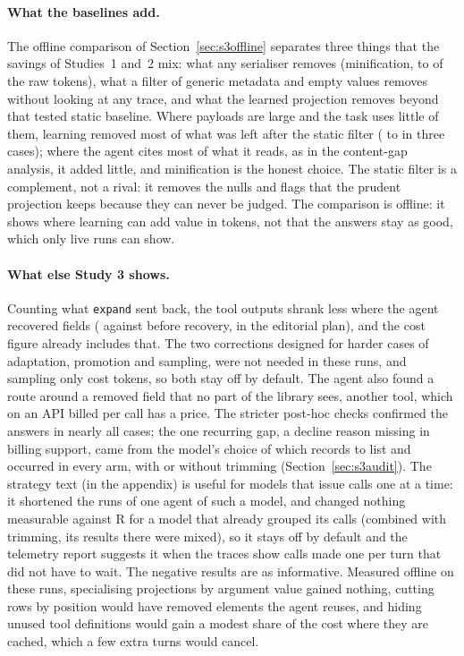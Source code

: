 \paragraph{What the baselines add.} The offline comparison of Section~\ref{sec:s3offline} separates three things
that the savings of Studies~1 and~2 mix: what any serialiser removes (minification, \BaseMinRawMin{} to
\BaseMinRawMax{} of the raw tokens), what a filter of generic metadata and empty values removes without looking at
any trace, and what the learned projection removes beyond that tested static baseline. Where payloads are large and the task uses little of them,
learning removed most of what was left after the static filter (\BaseLearnedStaticBigMin{} to
\BaseLearnedStaticBigMax{} in three cases); where the agent cites most of what it reads, as in the content-gap
analysis, it added little, and minification is the honest choice. The static filter is a complement, not a rival:
it removes the nulls and flags that the prudent projection keeps because they can never be judged. The comparison is
offline: it shows where learning can add value in tokens, not that the answers stay as good, which only live runs
can show.

\paragraph{What else Study 3 shows.} Counting what \texttt{expand} sent back, the tool outputs shrank less where the
agent recovered fields (\SthreeEOneTrimNeti{} against \SthreeEOneTrimBeforei{} before recovery, in the editorial
plan), and the cost figure already includes that. The two corrections designed for harder cases of adaptation,
promotion and sampling, were not needed in these runs, and sampling only cost tokens, so both stay off by default.
The agent also found a route around a removed field that no part of the library sees, another tool, which on an API
billed per call has a price. The stricter post-hoc checks confirmed the answers in nearly all cases; the one
recurring gap, a decline reason missing in billing support, came from the model's choice of which records to list
and occurred in every arm, with or without trimming (Section~\ref{sec:s3audit}). The strategy text (in the appendix)
is useful for models that issue calls one at a time: it shortened the runs of one agent of such a model, and changed
nothing measurable against R for a model that already grouped its calls (combined with trimming, its
results there were mixed), so it stays off by default and the
telemetry report suggests it when the traces show calls made one per turn that did not have to wait. The negative
results are as informative. Measured offline on these runs, specialising projections by argument value gained
nothing, cutting rows by position would have removed elements the agent reuses, and hiding unused tool definitions
would gain a modest share of the cost where they are cached, which a few extra turns would cancel.

